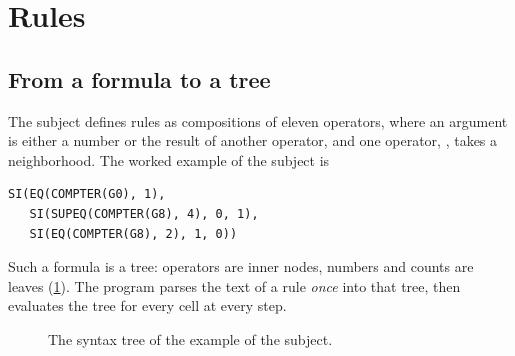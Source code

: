 \section{Rules}
\label{sec:rules}

\subsection{From a formula to a tree}

The subject defines rules as compositions of eleven operators, where an argument is either a
number or the result of another operator, and one operator, , takes a neighborhood.
The worked example of the subject is

\begin{lstlisting}[style=rule]
SI(EQ(COMPTER(G0), 1),
   SI(SUPEQ(COMPTER(G8), 4), 0, 1),
   SI(EQ(COMPTER(G8), 2), 1, 0))
\end{lstlisting}

Such a formula is a tree: operators are inner nodes, numbers and counts are leaves
(\cref{fig:tree}). The program parses the text of a rule \emph{once} into that tree, then
evaluates the tree for every cell at every step.

\begin{figure}[H]
    \centering
    \caption{The syntax tree of the example of the subject.}
    \label{fig:tree}
\end{figure}

